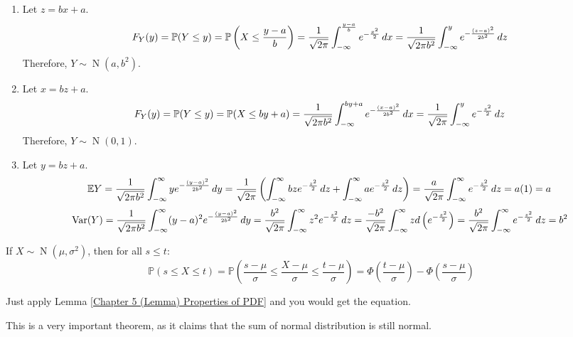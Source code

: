 \documentclass{huhtakm-template-book}
\newcommand{\prob}{\mathbb{P}}
\newcommand{\expect}{\mathbb{E}}
\DeclareMathOperator{\N}{N}
\DeclareMathOperator{\Var}{Var}
\begin{document}
\begin{proofing}
	\begin{enumerate}
		\item Let $z=bx+a$.
		\begin{equation*}
			F_{Y}(y)=\prob(Y\leq y)=\prob\left(X\leq\frac{y-a}{b}\right)=\frac{1}{\sqrt{2\pi}}\intlu{-\infty}{\frac{y-a}{b}}e^{-\frac{x^{2}}{2}}\,dx=\frac{1}{\sqrt{2\pi b^{2}}}\intlu{-\infty}{y}e^{-\frac{(z-a)^{2}}{2b^{2}}}\,dz
		\end{equation*}
		Therefore, $Y\sim\N(a,b^{2})$.
		\item Let $x=bz+a$.
		\begin{equation*}
			F_{Y}(y)=\prob(Y\leq y)=\prob(X\leq by+a)=\frac{1}{\sqrt{2\pi b^{2}}}\intlu{-\infty}{by+a}e^{-\frac{(x-a)^{2}}{2b^{2}}}\,dx=\frac{1}{\sqrt{2\pi}}\intlu{-\infty}{y}e^{-\frac{z^{2}}{2}}\,dz
		\end{equation*}
		Therefore, $Y\sim\N(0,1)$.
		\item Let $y=bz+a$.
		\begin{equation*}
			\expect Y=\frac{1}{\sqrt{2\pi b^{2}}}\intinfty ye^{-\frac{(y-a)^{2}}{2b^{2}}}\,dy=\frac{1}{\sqrt{2\pi}}\left(\intinfty bze^{-\frac{z^{2}}{2}}\,dz+\intinfty ae^{-\frac{z^{2}}{2}}\,dz\right)=\frac{a}{\sqrt{2\pi}}\intinfty e^{-\frac{z^{2}}{2}}\,dz=a(1)=a
		\end{equation*}
		\begin{equation*}
			\Var(Y)=\frac{1}{\sqrt{2\pi b^{2}}}\intinfty(y-a)^{2}e^{-\frac{(y-a)^{2}}{2b^{2}}}\,dy=\frac{b^{2}}{\sqrt{2\pi}}\intinfty z^{2}e^{-\frac{z^{2}}{2}}\,dz=\frac{-b^{2}}{\sqrt{2\pi}}\intinfty zd\left(e^{-\frac{z^{2}}{2}}\right)=\frac{b^{2}}{\sqrt{2\pi}}\intinfty e^{-\frac{z^{2}}{2}}\,dz=b^{2}
		\end{equation*}
	\end{enumerate}
\end{proofing}
\begin{lem}
	If $X\sim\N(\mu,\sigma^{2})$, then for all $s\leq t$:
	\begin{equation*}
		\prob(s\leq X\leq t)=\prob\left(\frac{s-\mu}{\sigma}\leq\frac{X-\mu}{\sigma}\leq\frac{t-\mu}{\sigma}\right)=\Phi\left(\frac{t-\mu}{\sigma}\right)-\Phi\left(\frac{s-\mu}{\sigma}\right)
	\end{equation*}
\end{lem}
\begin{proofing}
	Just apply Lemma \ref{Chapter 5 (Lemma) Properties of PDF} and you would get the equation.
\end{proofing}
This is a very important theorem, as it claims that the sum of normal distribution is still normal.
\end{document}
